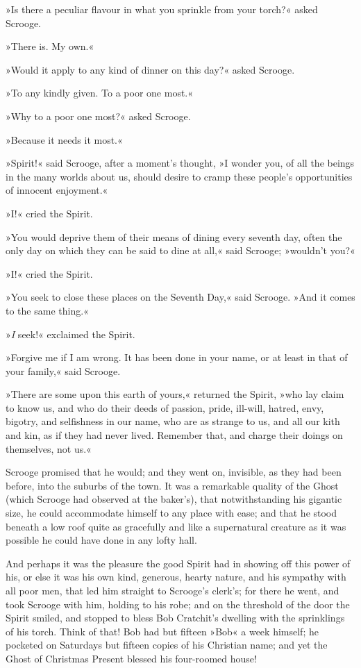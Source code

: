 »Is there a peculiar flavour in what you sprinkle from your torch?« asked Scrooge.

»There is. My own.«

»Would it apply to any kind of dinner on this day?« asked Scrooge.

»To any kindly given. To a poor one most.«

»Why to a poor one most?« asked Scrooge.

»Because it needs it most.«

»Spirit!« said Scrooge, after a moment's thought, »I wonder you, of all the beings in the many worlds about us, should desire to cramp these people's opportunities of innocent enjoyment.«

»I!« cried the Spirit.


»You would deprive them of their means of dining every seventh day, often the only day on which they can be said to dine at all,« said Scrooge; »wouldn't you?«

»I!« cried the Spirit.

»You seek to close these places on the Seventh Day,« said Scrooge. »And it comes to the same thing.«

»\textit{I} seek!« exclaimed the Spirit.

»Forgive me if I am wrong. It has been done in your name, or at least in that of your family,« said Scrooge.

»There are some upon this earth of yours,« returned the Spirit, »who lay claim to know us, and who do their deeds of passion, pride, ill-will, hatred, envy, bigotry, and selfishness in our name, who are as strange to us, and all our kith and kin, as if they had never lived. Remember that, and charge their doings on themselves, not us.«


Scrooge promised that he would; and they went on, invisible, as they had been before, into the suburbs of the town. It was a remarkable quality of the Ghost (which Scrooge had observed at the baker's), that notwithstanding his gigantic size, he could accommodate himself to any place with ease; and that he stood beneath a low roof quite as gracefully and like a supernatural creature as it was possible he could have done in any lofty hall.



And perhaps it was the pleasure the good Spirit had in showing off this power of his, or else it was his own kind, generous, hearty nature, and his sympathy with all poor men, that led him straight to Scrooge's clerk's; for there he went, and took Scrooge with him, holding to his robe; and on the threshold of the door the Spirit smiled, and stopped to bless Bob Cratchit's dwelling with the sprinklings of his torch. Think of that! Bob had but fifteen »Bob« a week himself; he pocketed on Saturdays but fifteen copies of his Christian name; and yet the Ghost of Christmas Present blessed his four-roomed house!

